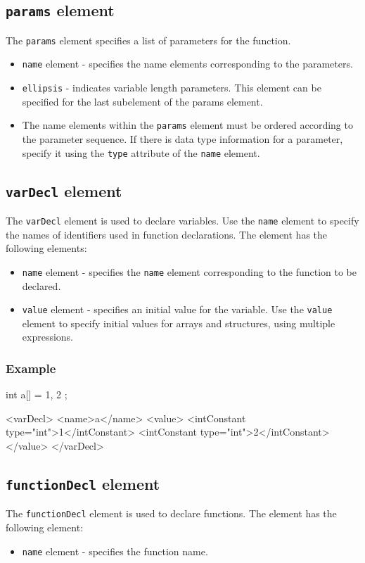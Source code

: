 \subsection{ {\tt params} element}

The {\tt params} element specifies a list of parameters for the function.

\begin{itemize}
\item {\tt name} element - specifies the name elements corresponding to the parameters.
\item {\tt ellipsis} - indicates variable length parameters. This element can be specified for the last subelement of the params element.
\item The name elements within the {\tt params} element must be ordered according to the parameter sequence. If there is data type information for a parameter, specify it using the {\tt type} attribute of the {\tt name} element. 
\end{itemize}


\subsection{ {\tt varDecl} element}

The {\tt varDecl} element is used to declare variables. Use the {\tt name} element to specify the names of identifiers used in function declarations. The element has the following elements:

\begin{itemize}
\item {\tt name} element - specifies the {\tt name} element corresponding to the function to be declared.
\item {\tt value} element - specifies an initial value for the variable. Use the {\tt value} element to specify initial values for arrays and structures, using multiple expressions.
\end{itemize}

\subsubsection*{Example}
\vspace{1mm}

\begin{CExample}
  int a[] = { 1, 2 };
\end{CExample}
\vspace{1mm}

\begin{XcodeMLExample}
  <varDecl>
    <name>a</name>
    <value>
      <intConstant type="int">1</intConstant>
      <intConstant type="int">2</intConstant>
    </value>
  </varDecl>
\end{XcodeMLExample}


\subsection{ {\tt functionDecl} element}

The {\tt functionDecl} element is used to declare functions. 
The element has the following element:

\begin{itemize}
\item {\tt name} element - specifies the function name.
\end{itemize}


